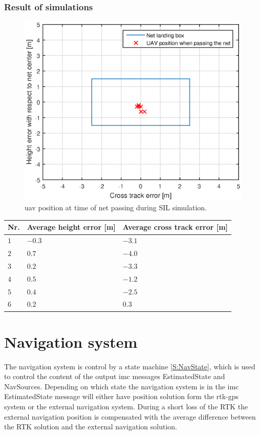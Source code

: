 \subsubsection{Result of simulations}
\begin{figure}[H]
\centering
\includegraphics[scale=0.7]{figs/SysPlot/SILNetPasing.eps}
\caption{\gls{uav} position at time of net passing during SIL simulation.}
\end{figure}
\begin{table}[H]
\centering
\begin{tabular}{| l | l | l |}
\hline
\textbf{Nr.} 	& \textbf{Average height error [m]} 	& \textbf{Average cross track error [m]}  \\ \hline
$1$				& $-0.3$							& $-3.1$								\\ \hline
$2$				& $0.7$							& $-4.0$								\\ \hline
$3$				& $0.2$							& $-3.3$								\\ \hline
$4$				& $0.5$							& $-1.2$								\\ \hline
$5$				& $0.4$							& $-2.5$								\\ \hline
$6$				& $0.2$							& $0.3$								\\ \hline
\end{tabular}
\end{table}

\section{Navigation system}
The navigation system is control by a state machine \ref{S:NavState}, which is used to control the content of the output \gls{imc} messages EstimatedState and NavSources. Depending on which state the navigation system is in the \gls{imc} EstimatedState message will either have position solution form the \gls{rtk-gps} system or the external navigation system. During a short loss of the RTK the external navigation position is compensated with the average difference between the RTK solution and the external navigation solution.
